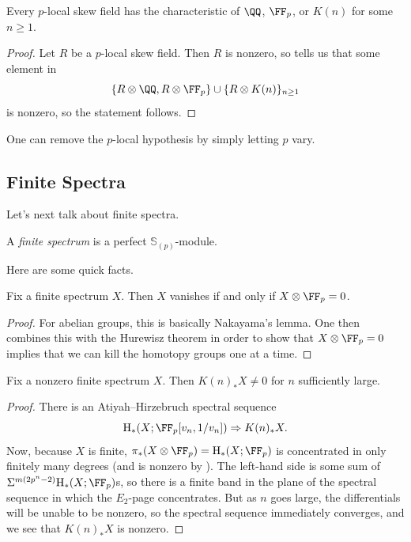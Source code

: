 \documentclass[../notes.tex]{subfiles}
\begin{document}
\begin{proposition}
	Every $p$-local skew field has the characteristic of $\QQ$, $\FF_p$, or $K(n)$ for some $n\ge1$.
\end{proposition}
\begin{proof}
	Let $R$ be a $p$-local skew field. Then $R$ is nonzero, so  tells us that some element in
	\[\{R\otimes\QQ,R\otimes\FF_p\}\cup\{R\otimes K(n)\}_{n\ge1}\]
	is nonzero, so the statement follows.
\end{proof}
\begin{remark}
	One can remove the $p$-local hypothesis by simply letting $p$ vary.
\end{remark}

\subsection{Finite Spectra}
Let's next talk about finite spectra.
\begin{definition}[finite]
	A \textit{finite spectrum} is a perfect $\mathbb S_{(p)}$-module.
\end{definition}
Here are some quick facts.
\begin{lemma} \label{lem:finite-nonzero-by-fp}
	Fix a finite spectrum $X$. Then $X$ vanishes if and only if $X\otimes\FF_p=0$.
\end{lemma}
\begin{proof}
	For abelian groups, this is basically Nakayama's lemma. One then combines this with the Hurewisz theorem in order to show that $X\otimes\FF_p=0$ implies that we can kill the homotopy groups one at a time.
\end{proof}
\begin{lemma}
	Fix a nonzero finite spectrum $X$. Then $K(n)_*X\ne0$ for $n$ sufficiently large.
\end{lemma}
\begin{proof}
	There is an Atiyah--Hirzebruch spectral sequence
	\[\mathrm H_*(X;\FF_p[v_n,1/v_n])\Rightarrow K(n)_*X.\]
	Now, because $X$ is finite, $\pi_*(X\otimes\FF_p)=\mathrm H_*(X;\FF_p)$ is concentrated in only finitely many degrees (and is nonzero by ). The left-hand side is some sum of $\Sigma^{m\left(2p^n-2\right)}\mathrm H_*(X;\FF_p)$s, so there is a finite band in the plane of the spectral sequence in which the $E_2$-page concentrates. But as $n$ goes large, the differentials will be unable to be nonzero, so the spectral sequence immediately converges, and we see that $K(n)_*X$ is nonzero.
\end{proof}
\end{document}
